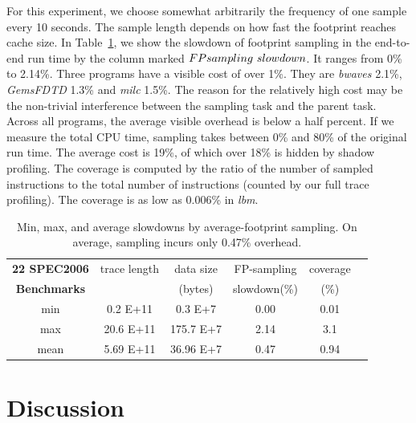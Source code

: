 For this experiment, we choose somewhat arbitrarily the frequency
of one sample every 10 seconds.  The sample length depends on how
fast the footprint reaches cache size. 
In Table~\ref{tbl:sampling-fp-speed}, we 
show the slowdown of footprint sampling in the end-to-end run time by the
column marked $FP\-sampling\ slowdown$.  It ranges from 0\% to
2.14\%. Three programs have a visible cost of over 1\%.  They are
\emph{bwaves} 2.1\%, \emph{GemsFDTD} 1.3\% and \emph{milc} 1.5\%.  The
reason for the relatively high cost may be the non-trivial
interference between the sampling task and the parent task.  Across
all programs, the average visible overhead is below a half percent.
If we measure the total CPU time, sampling takes between 0\% and 80\%
of the original run time.  The average cost is 19\%, of which
over 18\% is hidden by shadow profiling.  The coverage is computed by the ratio of the number of
sampled instructions to the total number of instructions (counted by
our full trace profiling).  The coverage is as low as 0.006\% in
\emph{lbm}.

\begin{table}[!h]
\centering
\begin{tabular}{|c|c|c|c|c|c|}
\hline
{\bf 22 SPEC2006} &trace length &data size & FP-sampling & coverage \\ 
{\bf Benchmarks} &              &(bytes) & slowdown(\%) & (\%)\\\hline \hline
min & 0.2 E+11 & 0.3 E+7 & 0.00 & 0.01 \\ \hline
max & 20.6 E+11 & 175.7 E+7 & 2.14 & 3.1\\ \hline
mean & 5.69 E+11 & 36.96 E+7 & 0.47 & 0.94\\ \hline
\end{tabular}
\caption{Min, max, and average slowdowns by average-footprint sampling.  On average, sampling incurs only 0.47\% overhead.}
\label{tbl:sampling-fp-speed}
\end{table}


\section{Discussion}


